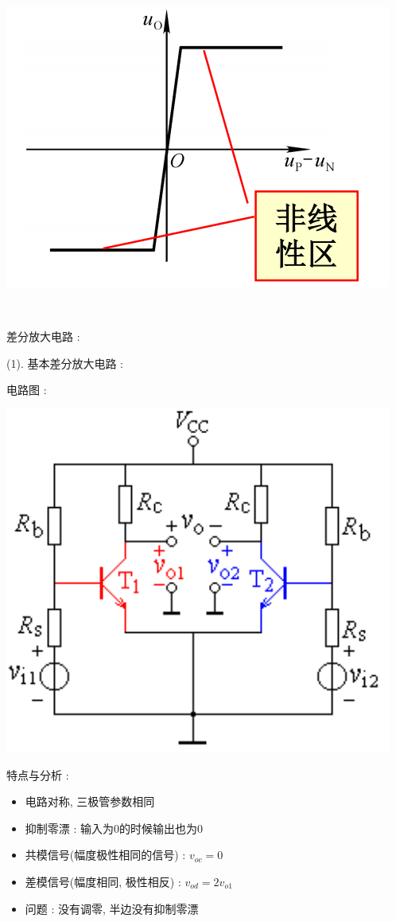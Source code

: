 \documentclass[UTF8, 12pt]{ctexart}
\begin{document}
	\includegraphics[scale = 0.4]{03/集成运算放大器电压传输特性.png}

	~

	\noindent
	差分放大电路 :

	(1). 基本差分放大电路 :

	电路图 :

	\includegraphics[scale = 0.4]{03/基本差分放大电路电路图.png}

	特点与分析 :
	\begin{itemize}[leftmargin = 4em]
		\item 电路对称, 三极管参数相同
		\item 抑制零漂 : 输入为0的时候输出也为0
		\item 共模信号(幅度极性相同的信号) : $ v_{oc} = 0 $
		\item 差模信号(幅度相同, 极性相反) : $ v_{od} = 2v_{o1} $
		\item 问题 : 没有调零, 半边没有抑制零漂
	\end{itemize}
\end{document}

